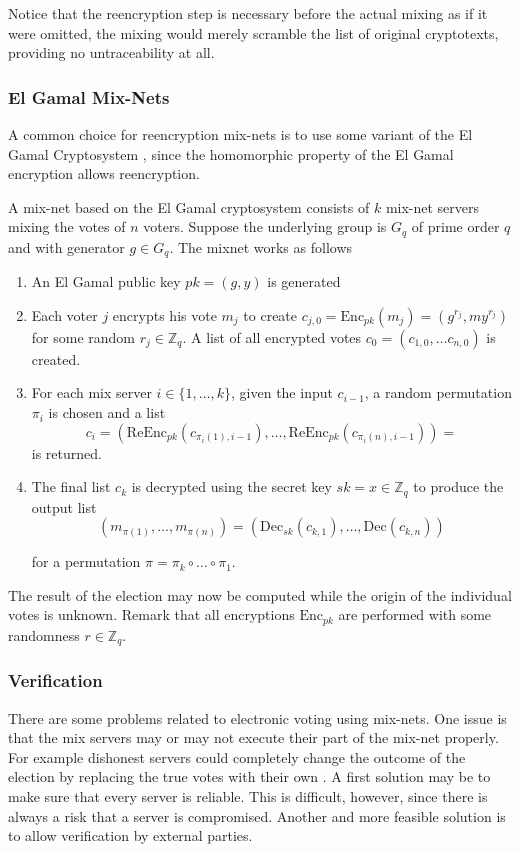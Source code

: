 Notice that the reencryption step is necessary before the actual
mixing as if it were omitted, the mixing would merely scramble the
list of original cryptotexts, providing no untraceability at all.

\subsubsection{El Gamal Mix-Nets}

A common choice for reencryption mix-nets is to use some variant of
the El Gamal Cryptosystem \cite{electronicvoting}, since the
homomorphic property of the El Gamal encryption allows reencryption.

A mix-net based on the El Gamal cryptosystem consists of $k$ mix-net
servers mixing the votes of $n$ voters. Suppose the underlying group
is $G_q$ of prime order $q$ and with generator $g \in G_q$. The mixnet
works as follows \cite{electronicvoting2}\\

\begin{enumerate}
\item An El Gamal public key $pk = (g,y)$ is generated
\item Each voter $j$ encrypts his vote $m_j$ to create $c_{j,0} =
  \mathrm{Enc}_{pk}(m_j) = (g^{r_j},my^{r_j})$ for some random $r_j
  \in \mathbb{Z}_q$.  A list of all encrypted votes $c_0 = \left(
  c_{1,0}, \hdots c_{n,0}\right)$ is created.
\item For each mix server $i \in \{1,\hdots, k\}$, given the input
  $c_{i-1}$, a random permutation $\pi _i$ is chosen and a list 
  $$ 
  c_i =\left(\mathrm{ReEnc}_{pk}(c_{\pi_i(1),i-1}), \hdots,
  \mathrm{ReEnc}_{pk}(c_{\pi_i(n), i-1})\right) =
  $$
  is returned.
\item The final list $c_k$ is decrypted using the secret key $sk = x
  \in \mathbb{Z}_q$ to produce the output list
 $$ 
  (m_{\pi (1)}, \hdots , m_{\pi (n)}) =
  \left(\mathrm{Dec}_{sk}(c_{k,1}), \hdots, \mathrm{Dec}(c_{k,n})\right)
  $$
  
  for a permutation $\pi = \pi_k \circ \hdots \circ \pi_1$.
\end{enumerate}

 The result of the election may now be computed while the origin of
 the individual votes is unknown. Remark that all encryptions
 $\mathrm{Enc}_{pk}$ are performed with some randomness $r \in
 \mathbb{Z}_q$.

\subsubsection{Verification}
There are some problems related to electronic voting using
mix-nets. One issue is that the mix servers may or may not execute
their part of the mix-net properly. For example dishonest servers
could completely change the outcome of the election by replacing the
true votes with their own \cite{electronicvoting}. A first solution
may be to make sure that every server is reliable. This is difficult,
however, since there is always a risk that a server is
compromised. Another and more feasible solution is to allow
verification by external parties.

